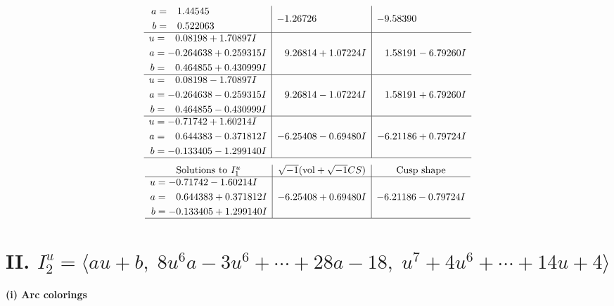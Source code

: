 \documentclass[1p]{elsarticle_modified}
\theoremstyle{definition}
\newcommand{\I}{\sqrt{-1}}
\begin{document}
$$\begin{array}{c|c|c}
\begin{aligned}
a &= \phantom{-}1.44545\phantom{ +0.000000I} \\
b &= \phantom{-}0.522063\phantom{ +0.000000I}\end{aligned}
 & -1.26726\phantom{ +0.000000I} & -9.58390\phantom{ +0.000000I} \\ \hline\begin{aligned}
u &= \phantom{-}0.08198 + 1.70897 I \\
a &= -0.264638 + 0.259315 I \\
b &= \phantom{-}0.464855 + 0.430999 I\end{aligned}
 & \phantom{-}9.26814 + 1.07224 I & \phantom{-}1.58191 - 6.79260 I \\ \hline\begin{aligned}
u &= \phantom{-}0.08198 - 1.70897 I \\
a &= -0.264638 - 0.259315 I \\
b &= \phantom{-}0.464855 - 0.430999 I\end{aligned}
 & \phantom{-}9.26814 - 1.07224 I & \phantom{-}1.58191 + 6.79260 I \\ \hline\begin{aligned}
u &= -0.71742 + 1.60214 I \\
a &= \phantom{-}0.644383 - 0.371812 I \\
b &= -0.133405 - 1.299140 I\end{aligned}
 & -6.25408 - 0.69480 I & -6.21186 + 0.79724 I\\
 \hline 
 \end{array}$$\newpage$$\begin{array}{c|c|c}  
\text{Solutions to }I^u_{1}& \I (\text{vol} + \sqrt{-1}CS) & \text{Cusp shape}\\
 \hline 
\begin{aligned}
u &= -0.71742 - 1.60214 I \\
a &= \phantom{-}0.644383 + 0.371812 I \\
b &= -0.133405 + 1.299140 I\end{aligned}
 & -6.25408 + 0.69480 I & -6.21186 - 0.79724 I\\
 \hline 
 \end{array}$$\newpage\newpage\renewcommand{\arraystretch}{1}
\centering \section*{II. $I^u_{2}= \langle a u+b,\;8 u^6 a-3 u^6+\cdots+28 a-18,\;u^7+4 u^6+\cdots+14 u+4 \rangle$}
\flushleft \textbf{(i) Arc colorings}\\
\end{document}
